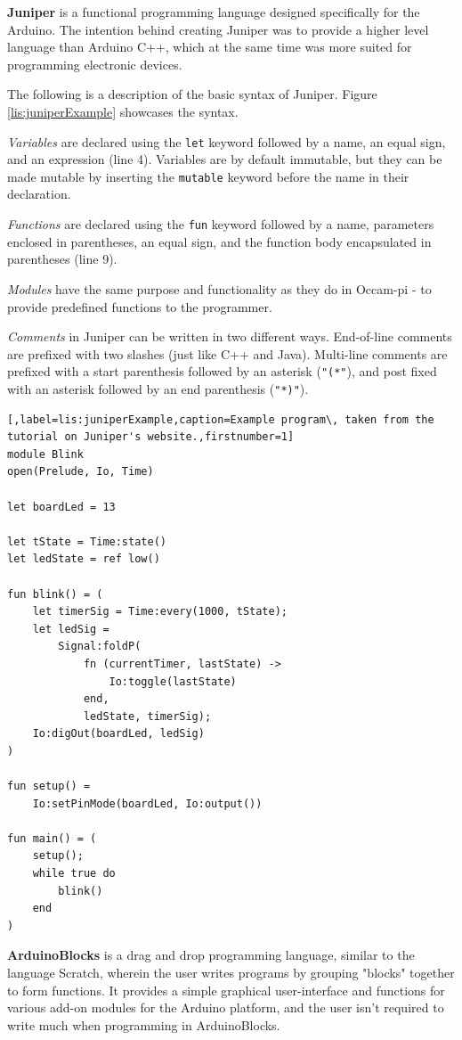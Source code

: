 \textbf{Juniper} is a functional programming language designed specifically for the Arduino.
The intention behind creating Juniper was to provide a higher level language than Arduino C++, which at the same time was more suited for programming electronic devices\cite{JuniperTutorial}.

The following is a description of the basic syntax of Juniper. 
Figure \ref{lis:juniperExample} showcases the syntax.

\textit{Variables} are declared using the \texttt{let} keyword followed by a name, an equal sign, and an expression (line 4).
Variables are by default immutable, but they can be made mutable by inserting the \texttt{mutable} keyword before the name in their declaration.

\textit{Functions} are declared using the \texttt{fun} keyword followed by a name, parameters enclosed in parentheses, an equal sign, and the function body encapsulated in parentheses (line 9).

\textit{Modules} have the same purpose and functionality as they do in Occam-pi - to provide predefined functions to the programmer.

\textit{Comments} in Juniper can be written in two different ways.
End-of-line comments are prefixed with two slashes (just like C++ and Java).
Multi-line comments are prefixed with a start parenthesis followed by an asterisk (\texttt{"(*"}), and post fixed with an asterisk followed by an end parenthesis (\texttt{"*)"}).

\begin{lstlisting}[,label=lis:juniperExample,caption=Example program\, taken from the tutorial on Juniper's website.,firstnumber=1]
module Blink
open(Prelude, Io, Time)

let boardLed = 13

let tState = Time:state()
let ledState = ref low()

fun blink() = (
	let timerSig = Time:every(1000, tState);
	let ledSig =
		Signal:foldP(
			fn (currentTimer, lastState) ->
				Io:toggle(lastState)
			end,
			ledState, timerSig);
	Io:digOut(boardLed, ledSig)
)

fun setup() =
	Io:setPinMode(boardLed, Io:output())

fun main() = (
	setup();
	while true do
		blink()
	end
)
\end{lstlisting}

\textbf{ArduinoBlocks} is a drag and drop programming language, similar to the language Scratch, wherein the user writes programs by grouping "blocks" together to form functions.
It provides a simple graphical user-interface and functions for various add-on modules for the Arduino platform, and the user isn't required to write much when programming in ArduinoBlocks.

